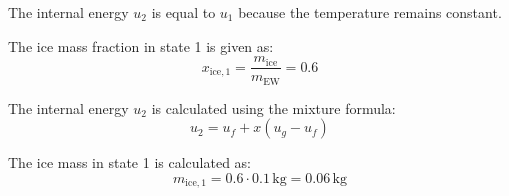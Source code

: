 The internal energy \( u_2 \) is equal to \( u_1 \) because the temperature remains constant.  

The ice mass fraction in state 1 is given as:  
\[
x_{\text{ice},1} = \frac{m_{\text{ice}}}{m_{\text{EW}}} = 0.6
\]  

The internal energy \( u_2 \) is calculated using the mixture formula:  
\[
u_2 = u_f + x (u_g - u_f)
\]  

The ice mass in state 1 is calculated as:  
\[
m_{\text{ice},1} = 0.6 \cdot 0.1 \, \text{kg} = 0.06 \, \text{kg}
\]